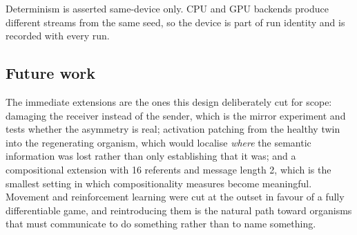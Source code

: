 Determinism is asserted same-device only. CPU and GPU backends produce different
streams from the same seed, so the device is part of run identity and is recorded
with every run.

\subsection{Future work}

The immediate extensions are the ones this design deliberately cut for scope:
damaging the receiver instead of the sender, which is the mirror experiment and
tests whether the asymmetry is real; activation patching from the healthy twin
into the regenerating organism, which would localise \emph{where} the semantic
information was lost rather than only establishing that it was; and a
compositional extension with 16 referents and message length 2, which is the
smallest setting in which compositionality measures become meaningful. Movement
and reinforcement learning were cut at the outset in favour of a fully
differentiable game, and reintroducing them is the natural path toward organisms
that must communicate to do something rather than to name something.

